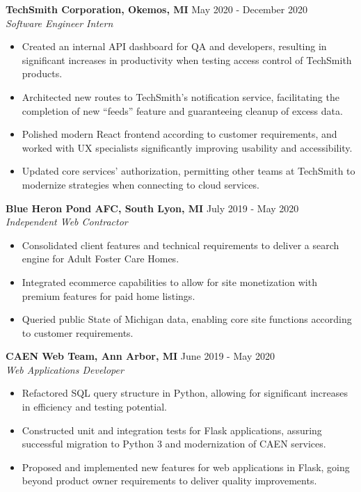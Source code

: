 \documentclass[overlapped]{res}
\begin{document}
\begin{resume}
    \textbf{TechSmith Corporation, Okemos, MI}
    \hfill May 2020 - December 2020 \\
    {\sl Software Engineer Intern}
    \begin{itemize}  \itemsep -2pt %
        \item Created an internal API dashboard for QA and developers, resulting in significant increases in productivity when testing access control of TechSmith products.
        \item Architected new routes to TechSmith's notification service, facilitating the completion of new ``feeds'' feature and guaranteeing cleanup of excess data.
        \item Polished modern React frontend according to customer requirements, and worked with UX specialists significantly improving usability and accessibility.
        \item Updated core services' authorization, permitting other teams at TechSmith to modernize strategies when connecting to cloud services.
    \end{itemize}
    
    \textbf{Blue Heron Pond AFC, South Lyon, MI}
    \hfill July 2019 - May 2020 \\
    {\sl Independent Web Contractor}
    \begin{itemize}  \itemsep -2pt %
        \item Consolidated client features and technical requirements to deliver a search engine for Adult Foster Care Homes.
        \item Integrated ecommerce capabilities to allow for site monetization with premium features for paid home listings.
        \item Queried public State of Michigan data, enabling core site functions according to customer requirements.
    \end{itemize}
    
    \textbf{CAEN Web Team, Ann Arbor, MI}
    \hfill June 2019 - May 2020 \\
    {\sl Web Applications Developer}
    \begin{itemize}  \itemsep -2pt %
        \item Refactored SQL query structure in Python, allowing for significant increases in efficiency and testing potential.
        \item Constructed unit and integration tests for Flask applications, assuring successful migration to Python 3 and modernization of CAEN services.
        \item Proposed and implemented new features for web applications in Flask, going beyond product owner requirements to deliver quality improvements.
    \end{itemize}
    

\end{resume}
\end{document}
